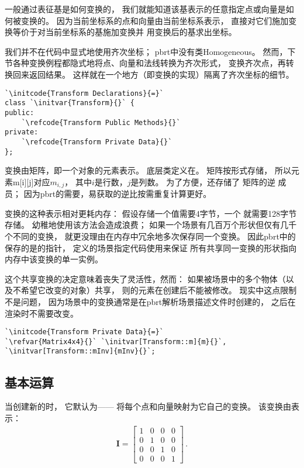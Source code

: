一般通过表征基是如何变换的，
我们就能知道该基表示的任意指定点或向量是如何被变换的。
因为当前坐标系的点和向量由当前坐标系表示，
直接对它们施加变换等价于对当前坐标系的基施加变换并
用变换后的基求出坐标。

我们并不在代码中显式地使用齐次坐标；
pbrt中没有类{\ttfamily Homogeneous}。
然而，下节各种变换例程都隐式地将点、向量和法线转换为齐次形式，
变换齐次点，再转换回来返回结果。
这样就在一个地方（即变换的实现）隔离了齐次坐标的细节。
\begin{lstlisting}
`\initcode{Transform Declarations}{=}`
class `\initvar{Transform}{}` {
public:
    `\refcode{Transform Public Methods}{}`
private:
    `\refcode{Transform Private Data}{}`
};
\end{lstlisting}

变换由矩阵，即一个对象的元素表示。
底层类定义在。
矩阵按形式存储，
所以元素{\ttfamily m[i][j]}对应$m_{i,j}$，
其中$i$是行数，$j$是列数。
为了方便，还存储了
矩阵的逆
成员；
因为pbrt的需要，易获取的逆比按需重复计算更好。

变换的这种表示相对更耗内存：
假设存储一个值需要4字节，一个
就需要128字节存储。
幼稚地使用该方法会造成浪费；
如果一个场景有几百万个形状但仅有几千个不同的变换，
就更没理由在内存中冗余地多次保存同一个变换。
因此pbrt中的保存的是的指针，
定义的场景指定代码使用来保证
所有共享同一变换的形状指向内存中该变换的单一实例。

这个共享变换的决定意味着丧失了灵活性，然而：
如果被场景中的多个物体（以及不希望它改变的对象）共享，
则的元素在创建后不能被修改。
现实中这点限制不是问题，
因为场景中的变换通常是在pbrt解析场景描述文件时创建的，
之后在渲染时不需要改变。
\begin{lstlisting}
`\initcode{Transform Private Data}{=}`
`\refvar{Matrix4x4}{}` `\initvar[Transform::m]{m}{}`, `\initvar[Transform::mInv]{mInv}{}`;
\end{lstlisting}

\subsection{基本运算}\label{sub:基本运算}
当创建新的时，
它默认为——
将每个点和向量映射为它自己的变换。
该变换由表示：
\begin{align*}
    \bm I=\left[
        \begin{array}{cccc}
            1 & 0 & 0 & 0 \\
            0 & 1 & 0 & 0 \\
            0 & 0 & 1 & 0 \\
            0 & 0 & 0 & 1
        \end{array}
        \right]\, .
\end{align*}

